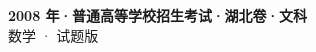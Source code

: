 \documentclass[zihao=-4, a4paper]{ctexart}
\begin{document}
\begin{center}
  {\Large\bfseries 2008 年·普通高等学校招生考试·湖北卷·文科}\\[4pt]
  {\large 数学 · 试题版}
\end{center}
\medskip
{}

\end{document}

